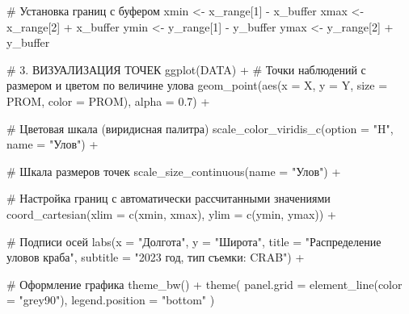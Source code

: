 \documentclass[
  letterpaper,
  DIV=11,
  numbers=noendperiod]{scrreprt}
\newenvironment{Shaded}{\begin{snugshade}}{\end{snugshade}}
\newcommand{\AttributeTok}[1]{\textcolor[rgb]{0.40,0.45,0.13}{#1}}
\newcommand{\CommentTok}[1]{\textcolor[rgb]{0.37,0.37,0.37}{#1}}
\newcommand{\DecValTok}[1]{\textcolor[rgb]{0.68,0.00,0.00}{#1}}
\newcommand{\FloatTok}[1]{\textcolor[rgb]{0.68,0.00,0.00}{#1}}
\newcommand{\FunctionTok}[1]{\textcolor[rgb]{0.28,0.35,0.67}{#1}}
\newcommand{\NormalTok}[1]{\textcolor[rgb]{0.00,0.23,0.31}{#1}}
\newcommand{\OtherTok}[1]{\textcolor[rgb]{0.00,0.23,0.31}{#1}}
\newcommand{\SpecialCharTok}[1]{\textcolor[rgb]{0.37,0.37,0.37}{#1}}
\newcommand{\StringTok}[1]{\textcolor[rgb]{0.13,0.47,0.30}{#1}}
\begin{document}
\begin{Shaded}
\begin{Highlighting}[]
\CommentTok{\# Установка границ с буфером}
\NormalTok{xmin }\OtherTok{\textless{}{-}}\NormalTok{ x\_range[}\DecValTok{1}\NormalTok{] }\SpecialCharTok{{-}}\NormalTok{ x\_buffer}
\NormalTok{xmax }\OtherTok{\textless{}{-}}\NormalTok{ x\_range[}\DecValTok{2}\NormalTok{] }\SpecialCharTok{+}\NormalTok{ x\_buffer}
\NormalTok{ymin }\OtherTok{\textless{}{-}}\NormalTok{ y\_range[}\DecValTok{1}\NormalTok{] }\SpecialCharTok{{-}}\NormalTok{ y\_buffer}
\NormalTok{ymax }\OtherTok{\textless{}{-}}\NormalTok{ y\_range[}\DecValTok{2}\NormalTok{] }\SpecialCharTok{+}\NormalTok{ y\_buffer}

\CommentTok{\# 3. ВИЗУАЛИЗАЦИЯ ТОЧЕК}
\FunctionTok{ggplot}\NormalTok{(DATA) }\SpecialCharTok{+}
  \CommentTok{\# Точки наблюдений с размером и цветом по величине улова}
  \FunctionTok{geom\_point}\NormalTok{(}\FunctionTok{aes}\NormalTok{(}\AttributeTok{x =}\NormalTok{ X, }\AttributeTok{y =}\NormalTok{ Y, }\AttributeTok{size =}\NormalTok{ PROM, }\AttributeTok{color =}\NormalTok{ PROM), }\AttributeTok{alpha =} \FloatTok{0.7}\NormalTok{) }\SpecialCharTok{+}
  
  \CommentTok{\# Цветовая шкала (виридисная палитра)}
  \FunctionTok{scale\_color\_viridis\_c}\NormalTok{(}\AttributeTok{option =} \StringTok{"H"}\NormalTok{, }\AttributeTok{name =} \StringTok{"Улов"}\NormalTok{) }\SpecialCharTok{+}
  
  \CommentTok{\# Шкала размеров точек}
  \FunctionTok{scale\_size\_continuous}\NormalTok{(}\AttributeTok{name =} \StringTok{"Улов"}\NormalTok{) }\SpecialCharTok{+}
  
  \CommentTok{\# Настройка границ с автоматически рассчитанными значениями}
  \FunctionTok{coord\_cartesian}\NormalTok{(}\AttributeTok{xlim =} \FunctionTok{c}\NormalTok{(xmin, xmax), }\AttributeTok{ylim =} \FunctionTok{c}\NormalTok{(ymin, ymax)) }\SpecialCharTok{+}
  
  \CommentTok{\# Подписи осей}
  \FunctionTok{labs}\NormalTok{(}\AttributeTok{x =} \StringTok{"Долгота"}\NormalTok{, }\AttributeTok{y =} \StringTok{"Широта"}\NormalTok{, }
       \AttributeTok{title =} \StringTok{"Распределение уловов краба"}\NormalTok{, }
       \AttributeTok{subtitle =} \StringTok{"2023 год, тип съемки: CRAB"}\NormalTok{) }\SpecialCharTok{+}
  
  \CommentTok{\# Оформление графика}
  \FunctionTok{theme\_bw}\NormalTok{() }\SpecialCharTok{+}
  \FunctionTok{theme}\NormalTok{(}
    \AttributeTok{panel.grid =} \FunctionTok{element\_line}\NormalTok{(}\AttributeTok{color =} \StringTok{"grey90"}\NormalTok{),}
    \AttributeTok{legend.position =} \StringTok{"bottom"}
\NormalTok{  )}
\end{Highlighting}
\end{Shaded}
\end{document}
